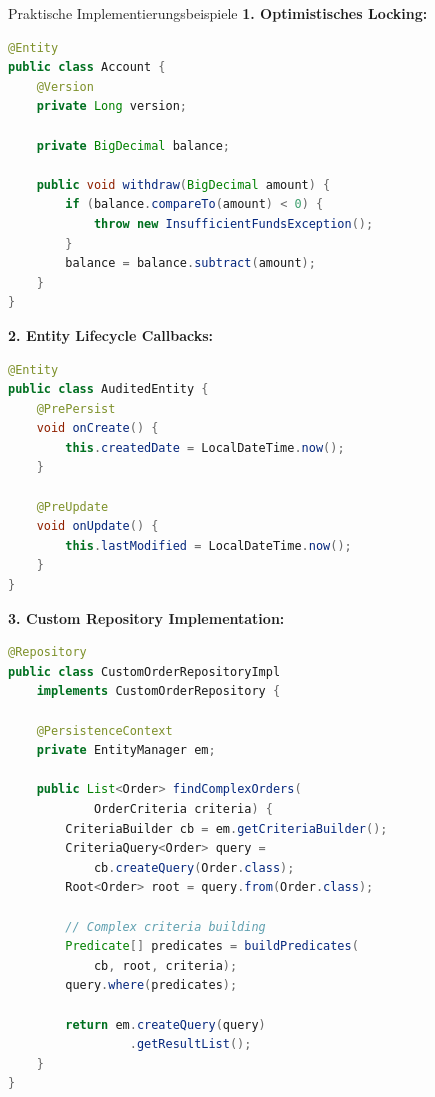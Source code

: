 \begin{example2}{Praktische Implementierungsbeispiele}
\textbf{1. Optimistisches Locking:}
\begin{lstlisting}[language=Java, style=base]
@Entity
public class Account {
    @Version
    private Long version;
    
    private BigDecimal balance;
    
    public void withdraw(BigDecimal amount) {
        if (balance.compareTo(amount) < 0) {
            throw new InsufficientFundsException();
        }
        balance = balance.subtract(amount);
    }
}
\end{lstlisting}

\textbf{2. Entity Lifecycle Callbacks:}
\begin{lstlisting}[language=Java, style=base]
@Entity
public class AuditedEntity {
    @PrePersist
    void onCreate() {
        this.createdDate = LocalDateTime.now();
    }
    
    @PreUpdate
    void onUpdate() {
        this.lastModified = LocalDateTime.now();
    }
}
\end{lstlisting}

\textbf{3. Custom Repository Implementation:}
\begin{lstlisting}[language=Java, style=base]
@Repository
public class CustomOrderRepositoryImpl 
    implements CustomOrderRepository {
    
    @PersistenceContext
    private EntityManager em;
    
    public List<Order> findComplexOrders(
            OrderCriteria criteria) {
        CriteriaBuilder cb = em.getCriteriaBuilder();
        CriteriaQuery<Order> query = 
            cb.createQuery(Order.class);
        Root<Order> root = query.from(Order.class);
        
        // Complex criteria building
        Predicate[] predicates = buildPredicates(
            cb, root, criteria);
        query.where(predicates);
        
        return em.createQuery(query)
                 .getResultList();
    }
}
\end{lstlisting}
\end{example2}


